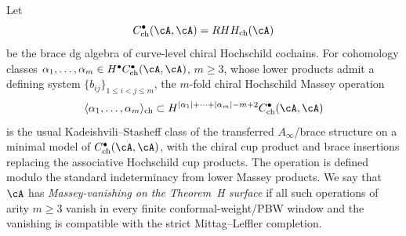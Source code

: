 \begin{definition}
\label{def:chiral-hochschild-massey-operations}
Let
\[
 C^\bullet_{\mathrm{ch}}(\cA,\cA)
 =
 RHH_{\mathrm{ch}}(\cA)
\]
be the brace dg algebra of curve-level chiral Hochschild cochains.
For cohomology classes
\(\alpha_1,\ldots,\alpha_m\in H^\bullet C^\bullet_{\mathrm{ch}}(\cA,\cA)\),
\(m\geq3\), whose lower products admit a defining system
\(\{b_{ij}\}_{1\leq i<j\leq m}\), the \(m\)-fold chiral Hochschild
Massey operation
\[
 \langle \alpha_1,\ldots,\alpha_m\rangle_{\mathrm{ch}}
 \subset
 H^{|\alpha_1|+\cdots+|\alpha_m|-m+2}
 C^\bullet_{\mathrm{ch}}(\cA,\cA)
\]
is the usual Kadeishvili--Stasheff class of the transferred
\(A_\infty\)/brace structure on a minimal model of
\(C^\bullet_{\mathrm{ch}}(\cA,\cA)\), with the chiral cup product and
brace insertions replacing the associative Hochschild cup products.
The operation is defined modulo the standard indeterminacy from lower
Massey products. We say that \(\cA\) has \emph{Massey-vanishing on the
Theorem~H surface} if all such operations of arity \(m\geq3\) vanish
in every finite conformal-weight/PBW window and the vanishing is
compatible with the strict Mittag--Leffler completion.
\end{definition}

